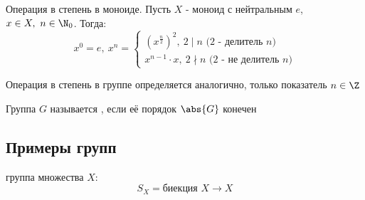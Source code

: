 \documentclass[a4paper, 14pt]{article}
\begin{document}
    \begin{definition}
        Операция { в степень в моноиде.} Пусть $X$ - моноид с нейтральным $e$, $x \in X, \ n \in \N_0$. Тогда:
        \[x^0 = e, \ x^n = 
        \begin{cases}
            \left(x^{\frac{n}{2}}\right)^2, \ 2 \mid n \text{ ($2$ - делитель $n$)}\\
            x^{n-1} \cdot x, \ 2 \nmid n \text{ ($2$ -  не делитель $n$)}
        \end{cases}\]
    \end{definition}
    
    \begin{definition}
        Операция { в степень в группе} определяется аналогично, только показатель $n \in \Z$
    \end{definition}
    
    \begin{definition}
        Группа $G$ называется {}, если её порядок $\abs{G}$ конечен
    \end{definition}
    
    \subsection{Примеры групп}
    \begin{definition}
        { группа} множества $X$: \[S_X = \text{биекция }X \rightarrow X \]
    \end{definition}
    
\end{document}
